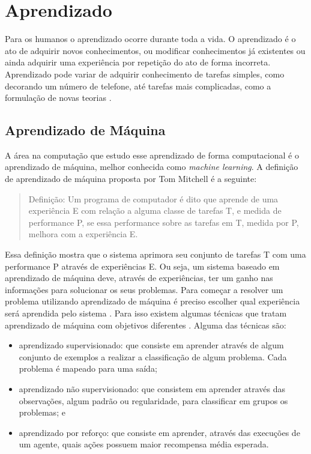 \chapter{\label{chap:aprendizado}Aprendizado}
 
Para os humanos o aprendizado ocorre durante toda a vida. 
O aprendizado é o ato de adquirir novos conhecimentos, ou modificar conhecimentos já existentes ou ainda adquirir uma experiência por repetição do ato de forma incorreta. 
Aprendizado pode variar de adquirir conhecimento de tarefas simples, como decorando um número de telefone, até tarefas mais complicadas, como a formulação de novas teorias \cite{intelligence2003modern}. 

\section{Aprendizado de Máquina} 

A área na computação que estudo esse aprendizado de forma computacional é o aprendizado de máquina, melhor conhecida como \textit{machine learning}. 
A definição de aprendizado de máquina proposta por Tom Mitchell \cite{Mitchell1997ML} é a seguinte:

\begin{quote}
	Definição: Um programa de computador é dito que aprende de uma experiência E com relação a alguma classe de tarefas T, e medida de performance P, se essa performance sobre as tarefas em T, medida por P, melhora com a experiência E.
\end{quote}

Essa definição mostra que o sistema aprimora seu conjunto de tarefas T com uma performance P através de experiências E. 
Ou seja, um sistema baseado em aprendizado de máquina deve, através de experiências, ter um ganho nas informações para solucionar os seus problemas. 
Para começar a resolver um problema utilizando aprendizado de máquina é preciso escolher qual experiência será aprendida pelo sistema \cite{Mitchell1997ML}. 
Para isso existem algumas técnicas que tratam aprendizado de máquina com objetivos diferentes \cite{intelligence2003modern}. 
Alguma das técnicas são: 
\begin{itemize}
	\item aprendizado supervisionado: que consiste em aprender através de algum conjunto de exemplos a realizar a classificação de algum problema. Cada problema é mapeado para uma saída;  
	\item aprendizado não supervisionado: que consistem em aprender através das observações, algum padrão ou regularidade, para classificar em grupos os problemas; e 
	\item aprendizado por reforço: que consiste em aprender, através das execuções de um agente, quais ações possuem maior recompensa média esperada.
\end{itemize}

